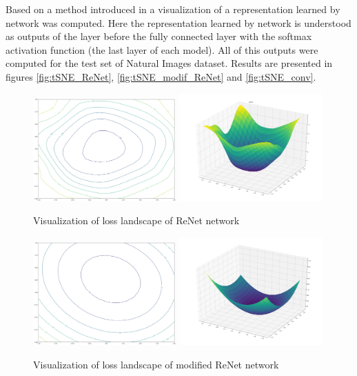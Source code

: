 \documentclass[a4paper, 10 pt, journal]{ieeeconf}
\begin{document}
Based on a method introduced in \cite{tSNE} a visualization of a representation learned by network was computed. Here the representation learned by network is understood as outputs of the layer before the fully connected layer with the softmax activation function (the last layer of each model). All of this outputs were computed for the test set of Natural Images dataset. Results are presented in figures \ref{fig:tSNE_ReNet}, \ref{fig:tSNE_modif_ReNet} and \ref{fig:tSNE_conv}.

\begin{figure}
\centering
	\includegraphics[width=0.49\textwidth]{img/loss_ReNet.png}
	\includegraphics[width=0.49\textwidth]{img/loss_3d_ReNet.png}
	\caption{Visualization of loss landscape of ReNet network}
	\label{fig:loss_ReNet}
\end{figure}

\begin{figure}
\centering
	\includegraphics[width=0.49\textwidth]{img/loss_modif_ReNet.png}
	\includegraphics[width=0.49\textwidth]{img/loss_3d_modif_ReNet.png}
	\caption{Visualization of loss landscape of modified ReNet network}
	\label{fig:loss_modif_ReNet}
\end{figure}
\end{document}
